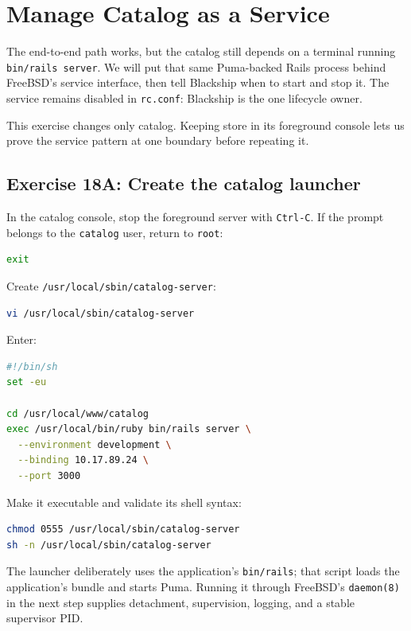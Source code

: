 \chapter{Manage Catalog as a Service}

The end-to-end path works, but the catalog still depends on a terminal running
\texttt{bin/rails server}. We will put that same Puma-backed Rails process
behind FreeBSD's service interface, then tell Blackship when to start and stop
it. The service remains disabled in \texttt{rc.conf}: Blackship is the one
lifecycle owner.

This exercise changes only catalog. Keeping store in its foreground console
lets us prove the service pattern at one boundary before repeating it.

\section{Exercise 18A: Create the catalog launcher}

In the catalog console, stop the foreground server with \texttt{Ctrl-C}. If the
prompt belongs to the \texttt{catalog} user, return to \texttt{root}:

\begin{lstlisting}[language=sh]
exit
\end{lstlisting}

Create \texttt{/usr/local/sbin/catalog-server}:

\begin{lstlisting}[language=sh]
vi /usr/local/sbin/catalog-server
\end{lstlisting}

Enter:

\begin{lstlisting}[language=sh]
#!/bin/sh
set -eu

cd /usr/local/www/catalog
exec /usr/local/bin/ruby bin/rails server \
  --environment development \
  --binding 10.17.89.24 \
  --port 3000
\end{lstlisting}

Make it executable and validate its shell syntax:

\begin{lstlisting}[language=sh]
chmod 0555 /usr/local/sbin/catalog-server
sh -n /usr/local/sbin/catalog-server
\end{lstlisting}

The launcher deliberately uses the application's \texttt{bin/rails}; that
script loads the application's bundle and starts Puma. Running it through
FreeBSD's \texttt{daemon(8)} in the next step supplies detachment, supervision,
logging, and a stable supervisor PID.

